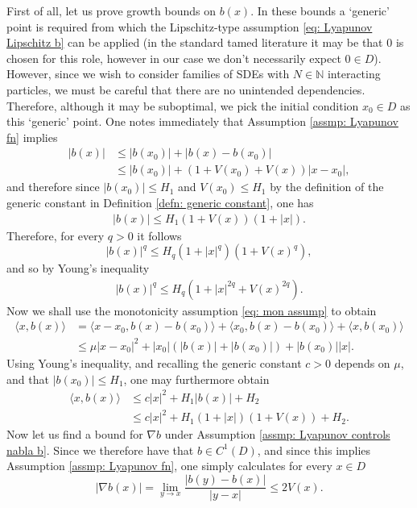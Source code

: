 \documentclass{article}
\begin{document}
First of all, let us prove growth bounds on $b(x)$. In these bounds a `generic' point is required from which the Lipschitz-type assumption \eqref{eq: Lyapunov Lipschitz b} can be applied (in the standard tamed literature it may be that $0$ is chosen for this role, however in our case we don't necessarily expect $0\in D$). However, since we wish to consider families of SDEs with $N\in \mathbb{N}$ interacting particles, we must be careful that there are no unintended dependencies. Therefore, although it may be suboptimal, we pick the initial condition $x_0\in D$ as this `generic' point. One notes immediately that Assumption \ref{assmp: Lyapunov fn} implies 
    \begin{align}
       \lvert b(x)\rvert &\leq \lvert b(x_0)\rvert+\lvert b(x)-b(x_0)\rvert \nonumber \\
       &\leq \lvert b(x_0)\rvert+(1+V(x_0)+V(x))\lvert x-x_0\rvert,
    \end{align}
    and therefore since $\lvert b(x_0)\rvert \leq H_1$ and $V(x_0)\leq H_1$ by the definition of the generic constant in Definition \ref{defn: generic constant}, one has
    \begin{align}\label{eq: first b bound}
       \lvert b(x)\rvert \leq H_1(1+V(x))(1+\lvert x \rvert).
    \end{align}
    Therefore, for every $q>0$ it follows
    \begin{equation}\label{eq: upper bound for b}
 \lvert b(x)\rvert ^q\leq H_q (1+\lvert x \rvert^q)(1+V(x)^q),
    \end{equation}
    and so by Young's inequality
    \begin{align}\label{eq: upper bound for b 2}
       \lvert b(x)\rvert^q \leq H_q(1+\lvert x \rvert^{2q}+V(x)^{2q}).
    \end{align}
    Now we shall use the monotonicity assumption \eqref{eq: mon assump} to obtain 
     \begin{align}
     \langle x, b(x)\rangle & = \langle x-x_0, b(x)-b(x_0)\rangle+\langle x_0, b(x)-b(x_0)\rangle+\langle x, b(x_0)\rangle \nonumber \\
     &\leq \mu\lvert x-x_0\rvert^2+\lvert x_0\rvert(\lvert b(x)\rvert+\lvert b(x_0)\rvert)+\lvert b(x_0)\rvert\lvert x\rvert.
    \end{align}
    Using Young's inequality, and recalling the generic constant $c>0$ depends on $\mu$, and that $\lvert b(x_0)\rvert\leq H_1$, one may furthermore obtain
     \begin{align}\label{eq: b bound using mon}
     \langle x, b(x)\rangle &\leq c\lvert x \rvert^2+H_1\lvert  b(x)\rvert +H_2\nonumber \\
     &\leq c\lvert x \rvert^2+H_1(1+\lvert x \rvert)(1+V(x))+H_2.
    \end{align}
Now let us find a bound for $\nabla b$ under Assumption \ref{assmp: Lyapunov controls nabla b}. Since we therefore have that $b\in C^1(D)$, and since this implies Assumption \ref{assmp: Lyapunov fn}, one simply calculates for every $x\in D$
\begin{equation}\label{eq: nabla b bound}
   \lvert  \nabla b(x)\rvert = \lim_{y\to x}\frac{\lvert b(y)-b(x)\rvert}{\lvert y-x\rvert}\leq 2V(x).
\end{equation}
\end{document}
